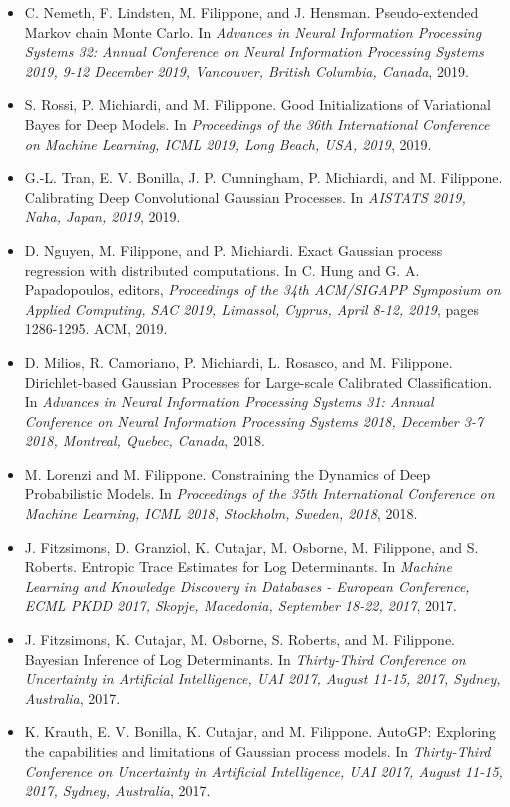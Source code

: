\begin{itemize}
\item  C. Nemeth, F. Lindsten, M. Filippone, and J. Hensman. Pseudo-extended Markov chain Monte Carlo. In \emph{Advances in Neural Information Processing Systems 32: Annual Conference on Neural Information Processing Systems 2019, 9-12 December 2019, Vancouver, British Columbia, Canada}, 2019.  
\item  S. Rossi, P. Michiardi, and M. Filippone. Good Initializations of Variational Bayes for Deep Models. In \emph{Proceedings of the 36th International Conference on Machine Learning, ICML 2019, Long Beach, USA, 2019}, 2019.  
\item  G.-L. Tran, E. V. Bonilla, J. P. Cunningham, P. Michiardi, and M. Filippone. Calibrating Deep Convolutional Gaussian Processes. In \emph{AISTATS 2019, Naha, Japan, 2019}, 2019.  
\item  D. Nguyen, M. Filippone, and P. Michiardi. Exact Gaussian process regression with distributed computations. In C. Hung and G. A. Papadopoulos, editors, \emph{Proceedings of the 34th ACM/SIGAPP Symposium on Applied Computing, SAC 2019, Limassol, Cyprus, April 8-12, 2019}, pages 1286-1295. ACM, 2019.  
\item  D. Milios, R. Camoriano, P. Michiardi, L. Rosasco, and M. Filippone. Dirichlet-based Gaussian Processes for Large-scale Calibrated Classification. In \emph{Advances in Neural Information Processing Systems 31: Annual Conference on Neural Information Processing Systems 2018, December 3-7 2018, Montreal, Quebec, Canada}, 2018.  
\item  M. Lorenzi and M. Filippone. Constraining the Dynamics of Deep Probabilistic Models. In \emph{Proceedings of the 35th International Conference on Machine Learning, ICML 2018, Stockholm, Sweden, 2018}, 2018.  
\item  J. Fitzsimons, D. Granziol, K. Cutajar, M. Osborne, M. Filippone, and S. Roberts. Entropic Trace Estimates for Log Determinants. In \emph{Machine Learning and Knowledge Discovery in Databases - European Conference, ECML PKDD 2017, Skopje, Macedonia, September 18-22, 2017}, 2017.  
\item  J. Fitzsimons, K. Cutajar, M. Osborne, S. Roberts, and M. Filippone. Bayesian Inference of Log Determinants. In \emph{Thirty-Third Conference on Uncertainty in Artificial Intelligence, UAI 2017, August 11-15, 2017, Sydney, Australia}, 2017.  
\item  K. Krauth, E. V. Bonilla, K. Cutajar, and M. Filippone. AutoGP: Exploring the capabilities and limitations of Gaussian process models. In \emph{Thirty-Third Conference on Uncertainty in Artificial Intelligence, UAI 2017, August 11-15, 2017, Sydney, Australia}, 2017.  

\end{itemize}

